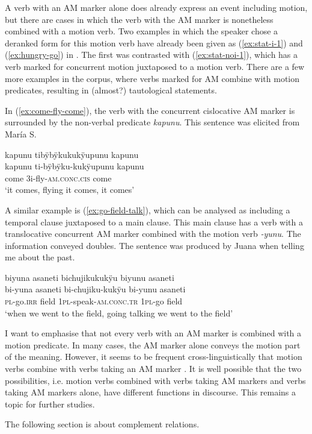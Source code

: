 A verb with an AM marker alone does already express an event including motion, but there are cases in which the verb with the AM marker is nonetheless combined with a motion verb. Two examples in which the speaker chose a deranked form for this motion verb have already been given as  (\ref{ex:stat-i-1}) and (\ref{ex:hungry-go}) in . The first was contrasted with (\ref{ex:stat-noi-1}), which has a verb marked for concurrent motion juxtaposed to a motion verb. There are a few more examples in the corpus, where verbs marked for AM combine with motion predicates, resulting in (almost?) tautological statements.

In (\ref{ex:come-fly-come}), the verb with the concurrent cislocative AM marker is surrounded by the non-verbal predicate \textit{kapunu}. This sentence was elicited from María S.

\ea\label{ex:come-fly-come}
\begingl
\glpreamble kapunu tibÿbÿkukukÿupunu kapunu\\
\gla kapunu ti-bÿbÿku-kukÿupunu kapunu\\
\glb come 3i-fly-\textsc{am.conc.cis} come\\
\glft ‘it comes, flying it comes, it comes’
\endgl
\trailingcitation{[rmx-e150922l.062]}
\xe

A similar example is (\ref{ex:go-field-talk}), which can be analysed as including a temporal clause juxtaposed to a main clause. This main clause has a verb with a translocative concurrent AM marker combined with the motion verb \textit{-yunu}. The information conveyed doubles. The sentence was produced by Juana when telling me about the past.

\ea\label{ex:go-field-talk}
\begingl
\glpreamble biyuna asaneti bichujikukukÿu biyunu asaneti\\
\gla bi-yuna asaneti bi-chujiku-kukÿu bi-yunu asaneti\\
\textsc{pl}-go.\textsc{irr} field 1\textsc{pl}-speak-\textsc{am.conc.tr} 1\textsc{pl}-go field\\
\glft ‘when we went to the field, going talking we went to the field’
\endgl
\trailingcitation{[jxx-p120515l-1.168]}
\xe

I want to emphasise that not every verb with an AM marker is combined with a motion predicate. In many cases, the AM marker alone conveys the motion part of the meaning. However, it seems to be frequent cross-linguistically that motion verbs combine with verbs taking an AM marker \citep[128]{Rose2015}. It is well possible that the two possibilities, i.e. motion verbs combined with verbs taking AM markers and verbs taking AM markers alone, have different functions in discourse. This remains a topic for further studies.

The following section is about complement relations.

